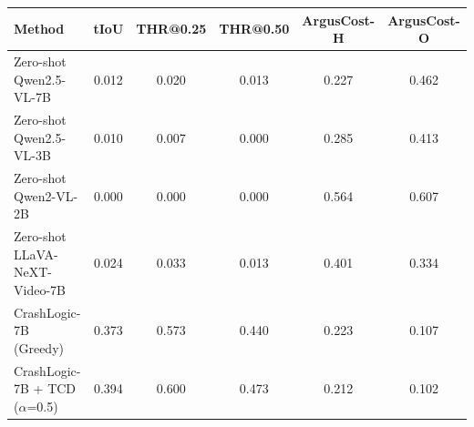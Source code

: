 \begin{tabular}{lccccc}
\toprule
Method & tIoU & THR@0.25 & THR@0.50 & ArgusCost-H & ArgusCost-O \\
\midrule
Zero-shot Qwen2.5-VL-7B & 0.012 & 0.020 & 0.013 & 0.227 & 0.462 \\
Zero-shot Qwen2.5-VL-3B & 0.010 & 0.007 & 0.000 & 0.285 & 0.413 \\
Zero-shot Qwen2-VL-2B & 0.000 & 0.000 & 0.000 & 0.564 & 0.607 \\
Zero-shot LLaVA-NeXT-Video-7B & 0.024 & 0.033 & 0.013 & 0.401 & 0.334 \\
CrashLogic-7B (Greedy) & 0.373 & 0.573 & 0.440 & 0.223 & 0.107 \\
CrashLogic-7B + TCD ($\alpha$=0.5) & 0.394 & 0.600 & 0.473 & 0.212 & 0.102 \\
\bottomrule
\end{tabular}
